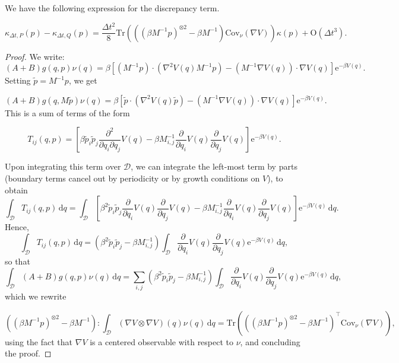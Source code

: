 \begin{prop}\label{prop discrepancy term}
  We have the following expression for the discrepancy term.

  \begin{equation}
    \label{discrepancy term}
    \kappa_{\Delta t,P}(p)- \kappa_{\Delta t,Q}(p)=\frac{\Delta t^2}8\mathrm{Tr}\left(\left(\left(\beta M^{-1}p\right)^{\otimes 2}-\beta M^{-1}\right)\mathrm{Cov}_\nu(\nabla V)\right)\kappa(p) +\mathrm{O}(\Delta t^3).
  \end{equation}
\end{prop}
\begin{proof}
We write:
  \begin{equation}
    (A+B)g(q,p)\nu(q)=\beta\left[\left(M^{-1}p\right)\cdot \left(\nabla^2V(q)M^{-1}p\right)-\left(M^{-1}\nabla V(q)\right)\cdot \nabla V(q)\right]\mathrm e^{-\beta V(q)}.
  \end{equation}
Setting $\tilde p= M^{-1}p$, we get 

\begin{equation}
  (A+B)g(q,M\tilde p)\nu(q)=\beta\left[\tilde p\cdot \left(\nabla^2V(q)\tilde p\right)-\left(M^{-1}\nabla V(q)\right)\cdot \nabla V(q)\right]\mathrm e^{-\beta V(q)}.
\end{equation}
This is a sum of terms of the form

$$T_{ij}(q,p)=\left[\beta \tilde p_i \tilde p_j \frac{\partial^2}{\partial q_i\partial q_j}V(q) - \beta M^{-1}_{i,j}\frac{\partial}{\partial q_i}V(q)\frac{\partial}{\partial q_j}V(q)\right]\mathrm e^{-\beta V(q)}.$$

Upon integrating this term over $\mathcal D$, we can integrate the left-most term by parts (boundary terms cancel out by periodicity or by growth conditions on $V$), to obtain
$$\int_{\mathcal D}T_{ij}(q,p)\,\mathrm{d}q=\int_{\mathcal D}\left[\beta^2\tilde p_i\tilde p_j \frac{\partial}{\partial q_i}V(q)\frac{\partial}{\partial q_j}V(q)-\beta M^{-1}_{i,j}\frac{\partial}{\partial q_i}V(q)\frac{\partial}{\partial q_j}V(q)\right]\mathrm e^{-\beta V(q)}\,\mathrm{d}q.$$
Hence,
$$\int_{\mathcal D}T_{ij}(q,p)\,\mathrm{d}q=\left(\beta^2\tilde p_i\tilde p_j -\beta M^{-1}_{i,j}\right)\int_{\mathcal D}\frac{\partial}{\partial q_i}V(q)\frac{\partial}{\partial q_j}V(q)\mathrm e^{-\beta V(q)}\,\mathrm{d}q,$$
so that
$$\int_{\mathcal D}(A+B)g(q,p)\nu(q)\,\mathrm{d}q=\sum_{i,j}\left(\beta^2\tilde p_i\tilde p_j -\beta M^{-1}_{i,j}\right)\int_{\mathcal D}\frac{\partial}{\partial q_i}V(q)\frac{\partial}{\partial q_j}V(q)\mathrm e^{-\beta V(q)}\,\mathrm{d}q,$$
which we rewrite

\begin{equation}
\left( \left(\beta M^{-1}p\right)^{\otimes 2}-\beta M^{-1}\right) : \int_{\mathcal D} \left(\nabla V \otimes \nabla V\right) (q) \nu(q)\,\mathrm{d}q=\mathrm{Tr}\left(\left(\left(\beta M^{-1}p\right)^{\otimes 2}-\beta M^{-1}\right)^\intercal\mathrm{Cov}_\nu(\nabla V)\right),
\end{equation}
using the fact that $\nabla V$ is a centered observable with respect to $\nu$, and concluding the proof.
\end{proof}

